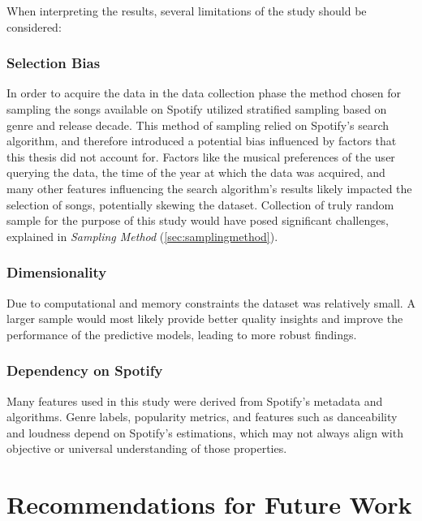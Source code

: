When interpreting the results, several limitations of the  study should be
considered:

\subsubsection*{Selection Bias}

In order to acquire the data in the data collection phase the method chosen for
sampling the songs available on Spotify utilized  stratified sampling based on
genre and release decade. This method of sampling relied on Spotify's search
algorithm, and therefore introduced a potential bias influenced by factors that
this thesis did not account for. Factors like the musical preferences of the
user querying the data, the time of the year at which the data was acquired,
and many other features influencing the search algorithm's results likely
impacted the selection of songs, potentially skewing the dataset. Collection of
truly random sample for the purpose of this study would have posed significant
challenges, explained in \textit{Sampling Method} (\ref{sec:samplingmethod}).


\subsubsection*{Dimensionality}

Due to computational and memory constraints the dataset was relatively small.
A larger sample would most likely provide better quality insights and improve
the performance of the predictive models, leading to more robust findings. 


\subsubsection*{Dependency on Spotify}
Many features used in this study were derived from Spotify's metadata and
algorithms. Genre labels, popularity metrics, and features such as danceability
and loudness depend on Spotify's estimations, which may not always align with
objective or universal understanding of those properties.



\section{Recommendations for Future Work}
\label{sec:recommendationsforfuturework}


